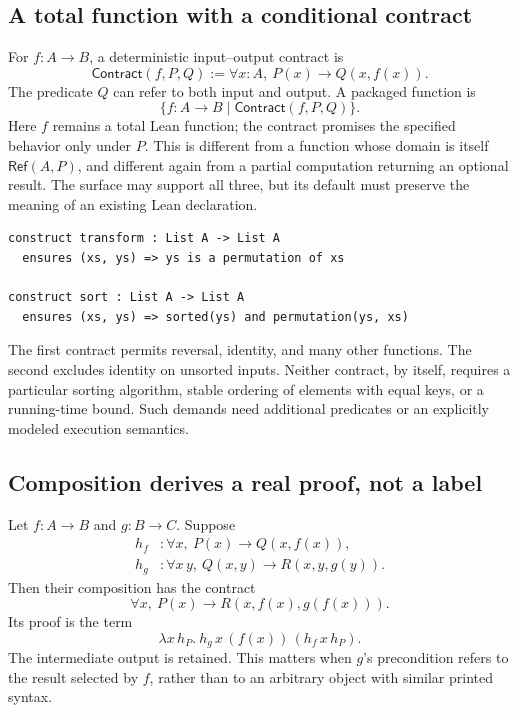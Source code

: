 \documentclass[11pt,a4paper]{article}
\newcommand{\Rfn}{\mathsf{Ref}}
\theoremstyle{plain}
\theoremstyle{definition}
\theoremstyle{remark}
\begin{document}
\subsection{A total function with a conditional contract}
For $f:A\to B$, a deterministic input--output contract is
\[
 \mathsf{Contract}(f,P,Q)
 :=\forall x:A,\ P(x)\to Q(x,f(x)).
\]
The predicate $Q$ can refer to both input and output. A packaged function is
\[
 \{f:A\to B\mid\mathsf{Contract}(f,P,Q)\}.
\]
Here $f$ remains a total Lean function; the contract promises the specified
behavior only under $P$. This is different from a function whose domain is
itself $\Rfn(A,P)$, and different again from a partial computation returning
an optional result. The surface may support all three, but its default must
preserve the meaning of an existing Lean declaration.

\par\noindent\begin{minipage}{\linewidth}
\begin{lstlisting}
construct transform : List A -> List A
  ensures (xs, ys) => ys is a permutation of xs

construct sort : List A -> List A
  ensures (xs, ys) => sorted(ys) and permutation(ys, xs)
\end{lstlisting}
\end{minipage}\par

The first contract permits reversal, identity, and many other functions. The
second excludes identity on unsorted inputs. Neither contract, by itself,
requires a particular sorting algorithm, stable ordering of elements with
equal keys, or a running-time bound. Such demands need additional predicates
or an explicitly modeled execution semantics.

\subsection{Composition derives a real proof, not a label}
Let $f:A\to B$ and $g:B\to C$. Suppose
\begin{align*}
 h_f&:\forall x,\ P(x)\to Q(x,f(x)),\\
 h_g&:\forall x\,y,\ Q(x,y)\to R(x,y,g(y)).
\end{align*}
Then their composition has the contract
\[
 \forall x,\ P(x)\to R(x,f(x),g(f(x))).
\]
Its proof is the term
\[
 \lambda x\,h_P.\ h_g\,x\,(f(x))\,(h_f\,x\,h_P).
\]
The intermediate output is retained. This matters when $g$'s precondition
refers to the result selected by $f$, rather than to an arbitrary object with
similar printed syntax.
\end{document}
